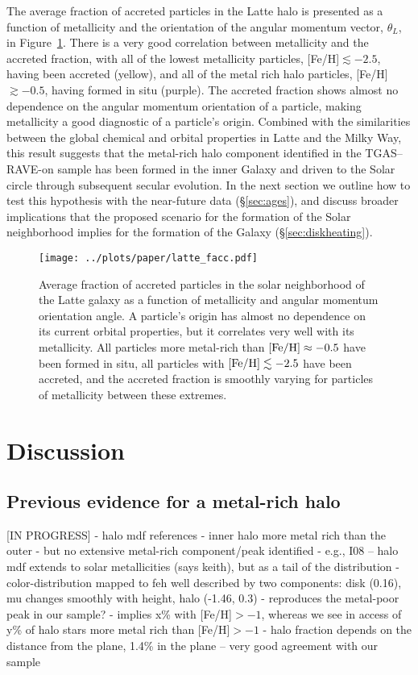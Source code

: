 \documentclass[apj, twocolappendix, numberedappendix, appendixfloats]{emulateapj}
\begin{document}
The average fraction of accreted particles in the Latte halo is presented as a function of metallicity and the orientation of the angular momentum vector, $\theta_L$, in Figure~\ref{fig:facc}.
There is a very good correlation between metallicity and the accreted fraction, with all of the lowest metallicity particles, [Fe/H]$\lesssim-2.5$, having been accreted (yellow), and all of the metal rich halo particles, [Fe/H]$\gtrsim-0.5$, having formed in situ (purple).
The accreted fraction shows almost no dependence on the angular momentum orientation of a particle, making metallicity a good diagnostic of a particle's origin.
Combined with the similarities between the global chemical and orbital properties in Latte and the Milky Way, this result suggests that the metal-rich halo component identified in the TGAS--RAVE-on sample has been formed in the inner Galaxy and driven to the Solar circle through subsequent secular evolution.
In the next section we outline how to test this hypothesis with the near-future data (\S\ref{sec:ages}), and discuss broader implications that the proposed scenario for the formation of the Solar neighborhood implies for the formation of the Galaxy (\S\ref{sec:diskheating}).

\begin{figure}
\begin{center}
\texttt{[image: ../plots/paper/latte\_facc.pdf]}
\caption{Average fraction of accreted particles in the solar neighborhood of the Latte galaxy as a function of metallicity and angular momentum orientation angle.
A particle's origin has almost no dependence on its current orbital properties, but it correlates very well with its metallicity.
All particles more metal-rich than $\rm[Fe/H]\approx-0.5$ have been formed in situ, all particles with $\rm[Fe/H]\lesssim-2.5$ have been accreted, and the accreted fraction is smoothly varying for particles of metallicity between these extremes.}
\label{fig:facc}
\end{center}
\end{figure}

\section{Discussion}

\subsection{Previous evidence for a metal-rich halo}
[IN PROGRESS]
- halo mdf references
- inner halo more metal rich than the outer
- but no extensive metal-rich component/peak identified
- e.g., I08 -- halo mdf extends to solar metallicities (says keith), but as a tail of the distribution
- color-distribution mapped to feh well described by two components: disk (0.16), mu changes smoothly with height, halo (-1.46, 0.3)
- reproduces the metal-poor peak in our sample?
- implies x\% with [Fe/H]$>-1$, whereas we see in access of y\% of halo stars more metal rich than [Fe/H]$>-1$
- halo fraction depends on the distance from the plane, 1.4\% in the plane -- very good agreement with our sample
\end{document}
